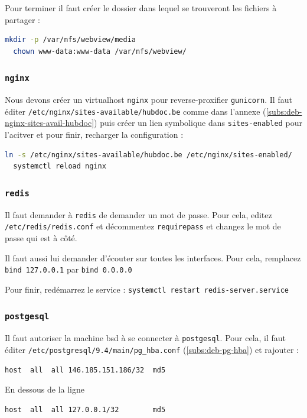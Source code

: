\documentclass[10pt,a4paper]{article}
\begin{document}
Pour terminer il faut créer le dossier dans lequel se trouveront les fichiers à partager :
\begin{lstlisting}[language=bash]
  mkdir -p /var/nfs/webview/media
  chown www-data:www-data /var/nfs/webview/
\end{lstlisting}

\subsubsection{\texttt{nginx}}

Nous devons créer un virtualhost \texttt{nginx} pour reverse-proxifier \texttt{gunicorn}.
Il faut éditer \texttt{/etc/nginx/sites-available/hubdoc.be} comme dans l'annexe (\ref{subs:deb-nginx-sites-avail-hubdoc})
puis créer un lien symbolique dans \texttt{sites-enabled} pour l'acitver et pour finir,
recharger la configuration :
\begin{lstlisting}[language=bash]
  ln -s /etc/nginx/sites-available/hubdoc.be /etc/nginx/sites-enabled/
  systemctl reload nginx
\end{lstlisting}

\subsubsection{\texttt{redis}}

Il faut demander à \texttt{redis} de demander un mot de passe.
Pour cela, editez \texttt{/etc/redis/redis.conf} et décommentez \texttt{requirepass}
et changez le mot de passe qui est à côté.

Il faut aussi lui demander d'écouter sur toutes les interfaces.
Pour cela, remplacez \texttt{bind 127.0.0.1} par \texttt{bind 0.0.0.0}

Pour finir, redémarrez le service : \texttt{systemctl restart redis-server.service}


\subsubsection{\texttt{postgesql}}

Il faut autoriser la machine bsd à se connecter à \texttt{postgesql}.
Pour cela, il faut éditer \texttt{/etc/postgresql/9.4/main/pg\_hba.conf} (\ref{subs:deb-pg-hba}) et rajouter :
\begin{lstlisting}[language=bash]
  host  all  all 146.185.151.186/32  md5
\end{lstlisting}
En dessous de la ligne
\begin{lstlisting}[language=bash]
  host  all  all 127.0.0.1/32        md5
\end{lstlisting}
\end{document}
